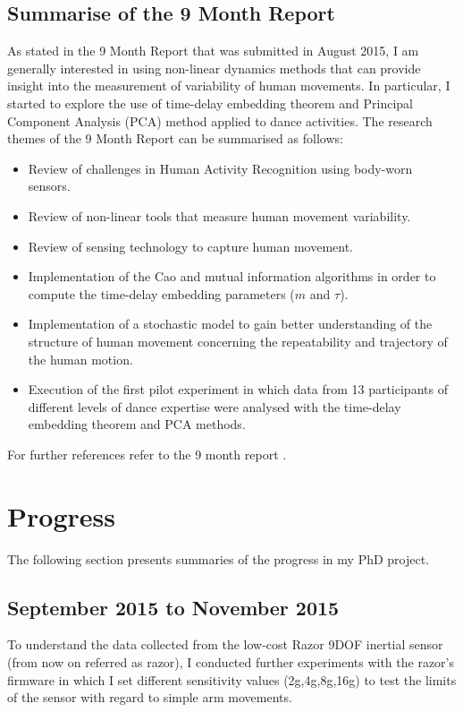 \documentclass[9pt,journal,onecolumn,compsoc]{IEEEtran}
\begin{document}
\subsection{Summarise of the 9 Month Report}
As stated in the 9 Month Report that was submitted in August 2015,
I am generally interested in using non-linear dynamics methods 
that can provide insight into the measurement of variability of human movements.
In particular, I started to explore the use of time-delay embedding theorem and 
Principal Component Analysis (PCA) method applied to dance activities. 
The research themes of the 9 Month Report can be summarised as follows:

\begin{itemize}
 \item Review of challenges in Human Activity Recognition using body-worn sensors.
 \item Review of non-linear tools that measure human movement variability.
 \item Review of sensing technology to capture human movement.
 \item Implementation of the Cao and mutual information algorithms in order 
    to compute the time-delay embedding parameters ($m$ and $\tau$).
 \item Implementation of a stochastic model to gain better understanding of the 
 structure of human movement concerning 
 the repeatability and trajectory of the human motion.
 \item Execution of the first pilot experiment in which data from 13 participants of different 
 levels of dance expertise were analysed with the time-delay embedding theorem and PCA methods.
\end{itemize}

For further references refer to the 9 month report \cite{mxochicale_9monthreport}.

\section{Progress}

The following section presents summaries of the progress in my PhD project.

\subsection{September 2015 to November 2015}

To understand the data collected from the low-cost Razor 9DOF inertial sensor
(from now on referred as razor),
I conducted further experiments with the razor's firmware in which I set 
different sensitivity values (2g,4g,8g,16g) to test the limits of the sensor
with regard to simple arm movements.
\end{document}
